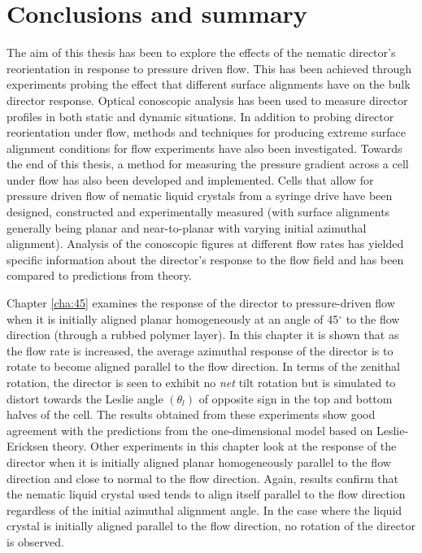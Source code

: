 \section{Conclusions and summary}
\label{cha:conclusions}
The aim of this thesis has been to explore the effects of the nematic director's reorientation in response to pressure driven flow. This has been achieved through experiments probing the effect that different surface alignments have on the bulk director response. Optical conoscopic analysis has been used to measure director profiles in both static and dynamic situations. In addition to probing director reorientation under flow, methods and techniques for producing extreme surface alignment conditions for flow experiments have also been investigated. Towards the end of this thesis, a method for measuring the pressure gradient across a cell under flow has also been developed and implemented. Cells that allow for pressure driven flow of nematic liquid crystals from a syringe drive have been designed, constructed and experimentally measured (with surface alignments generally being planar and near-to-planar with varying initial azimuthal alignment). Analysis of the conoscopic figures at different flow rates has yielded specific information about the director's response to the flow field and has been compared to predictions from theory. 

Chapter \ref{cha:45} examines the response of the director to pressure-driven flow when it is initially aligned planar homogeneously at an angle of 45$^{\circ}$ to the flow direction (through a rubbed polymer layer). In this chapter it is shown that as the flow rate is increased, the average azimuthal response of the director is to rotate to become aligned parallel to the flow direction. In terms of the zenithal rotation, the director is seen to exhibit no \textit{net} tilt rotation but is simulated to distort towards the Leslie angle $\left(\theta_l\right)$ of opposite sign in the top and bottom halves of the cell. The results obtained from these experiments show good agreement with the predictions from the one-dimensional model based on Leslie-Ericksen theory. Other experiments in this chapter look at the response of the director when it is initially aligned planar homogeneously parallel to the flow direction and close to normal to the flow direction. Again, results confirm that the nematic liquid crystal used tends to align itself parallel to the flow direction regardless of the initial azimuthal alignment angle. In the case where the liquid crystal is initially aligned parallel to the flow direction, no rotation of the director is observed.

